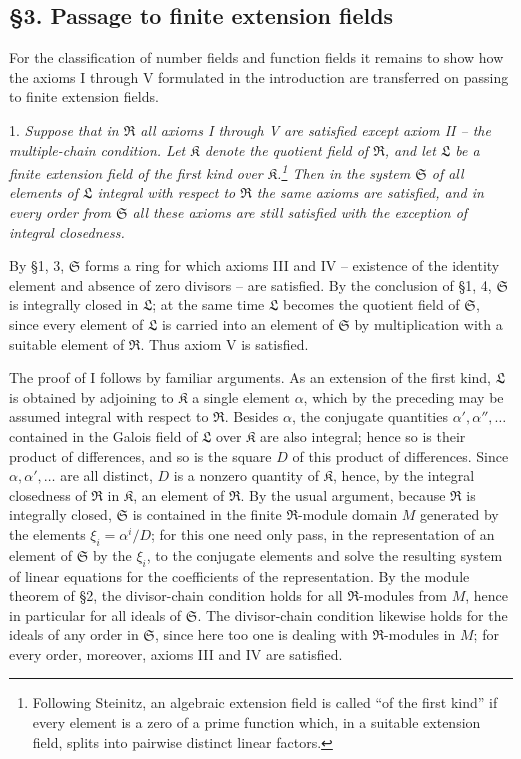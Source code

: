 \documentclass[11pt]{article}
\providecommand{\mR}{\mathfrak{R}}
\providecommand{\mK}{\mathfrak{K}}
\providecommand{\mL}{\mathfrak{L}}
\providecommand{\mS}{\mathfrak{S}}
\begin{document}
\setcounter{footnote}{13}

\subsection*{§3. Passage to finite extension fields}

For the classification of number fields and function fields it remains to show how the axioms I through V formulated in the introduction are transferred on passing to finite extension fields.

1. \emph{Suppose that in $\mR$ all axioms I through V are satisfied except axiom II -- the multiple-chain condition. Let $\mK$ denote the quotient field of $\mR$, and let $\mL$ be a finite extension field of the first kind over $\mK$.\footnote{Following Steinitz, an algebraic extension field is called ``of the first kind'' if every element is a zero of a prime function which, in a suitable extension field, splits into pairwise distinct linear factors.} Then in the system $\mS$ of all elements of $\mL$ integral with respect to $\mR$ the same axioms are satisfied, and in every order from $\mS$ all these axioms are still satisfied with the exception of integral closedness.}

By §1, 3, $\mS$ forms a ring for which axioms III and IV -- existence of the identity element and absence of zero divisors -- are satisfied. By the conclusion of §1, 4, $\mS$ is integrally closed in $\mL$; at the same time $\mL$ becomes the quotient field of $\mS$, since every element of $\mL$ is carried into an element of $\mS$ by multiplication with a suitable element of $\mR$. Thus axiom V is satisfied.

The proof of I follows by familiar arguments. As an extension of the first kind, $\mL$ is obtained by adjoining to $\mK$ a single element $\alpha$, which by the preceding may be assumed integral with respect to $\mR$. Besides $\alpha$, the conjugate quantities $\alpha',\alpha'',\ldots$ contained in the Galois field of $\mL$ over $\mK$ are also integral; hence so is their product of differences, and so is the square $D$ of this product of differences. Since $\alpha,\alpha',\ldots$ are all distinct, $D$ is a nonzero quantity of $\mK$, hence, by the integral closedness of $\mR$ in $\mK$, an element of $\mR$. By the usual argument, because $\mR$ is integrally closed, $\mS$ is contained in the finite $\mR$-module domain $M$ generated by the elements $\xi_i=\alpha^i/D$; for this one need only pass, in the representation of an element of $\mS$ by the $\xi_i$, to the conjugate elements and solve the resulting system of linear equations for the coefficients of the representation. By the module theorem of §2, the divisor-chain condition holds for all $\mR$-modules from $M$, hence in particular for all ideals of $\mS$. The divisor-chain condition likewise holds for the ideals of any order in $\mS$, since here too one is dealing with $\mR$-modules in $M$; for every order, moreover, axioms III and IV are satisfied.
\end{document}
